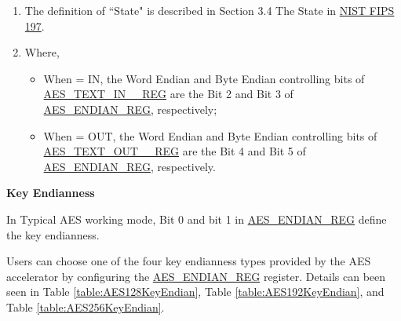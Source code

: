 \documentclass[main\_\_EN.tex]{subfiles}
\begin{document}
\newpage
\begin{tiplisting}
\vspace{-2.5em}
\begin{enumerate}
\item The definition of ``State" is described in Section 3.4 The State in \href{https://nvlpubs.nist.gov/nistpubs/FIPS/NIST.FIPS.197.pdf}{NIST FIPS 197}.
\item Where,
\begin{itemize}
    \item When  = IN, the Word Endian and Byte Endian controlling bits of \hyperref[regdesc:AESTEXTINnREG]{AES\_TEXT\_IN\_\_REG} are the Bit 2 and Bit 3 of \hyperref[regdesc:AESENDIANREG]{AES\_ENDIAN\_REG}, respectively;
    \item When  = OUT, the Word Endian and Byte Endian controlling bits of \hyperref[regdesc:AESTEXTINnREG]{AES\_TEXT\_OUT\_\_REG} are the Bit 4 and Bit 5 of \hyperref[regdesc:AESENDIANREG]{AES\_ENDIAN\_REG}, respectively.
\end{itemize}
\end{enumerate}
\end{tiplisting}


\textbf{Key Endianness}

In Typical AES working mode, Bit 0 and bit 1 in \hyperref[regdesc:AESENDIANREG]{AES\_ENDIAN\_REG} define the key endianness.

Users can choose one of the four key endianness types provided by the AES accelerator by configuring the \hyperref[regdesc:AESENDIANREG]{AES\_ENDIAN\_REG} register. Details can been seen in Table \ref{table:AES128KeyEndian}, Table \ref{table:AES192KeyEndian}, and Table \ref{table:AES256KeyEndian}.
\end{document}
